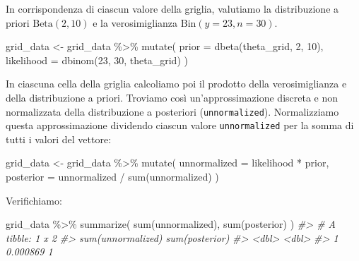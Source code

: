 \documentclass[
  11pt,
]{krantz}
\makeatletter
\newenvironment{Shaded}{\begin{snugshade}}{\end{snugshade}}
\newcommand{\AttributeTok}[1]{\textcolor[rgb]{0.61,0.61,0.61}{#1}}
\newcommand{\CommentTok}[1]{\textcolor[rgb]{0.37,0.37,0.37}{\textit{#1}}}
\newcommand{\DecValTok}[1]{\textcolor[rgb]{0.06,0.06,0.06}{#1}}
\newcommand{\FunctionTok}[1]{\textcolor[rgb]{0,0,0}{#1}}
\newcommand{\NormalTok}[1]{#1}
\newcommand{\OtherTok}[1]{\textcolor[rgb]{0.37,0.37,0.37}{#1}}
\newcommand{\SpecialCharTok}[1]{\textcolor[rgb]{0,0,0}{#1}}
\newenvironment{kframe}{%
\medskip{}
\setlength{\fboxsep}{.8em}
 \def\at@end@of@kframe{}%
 \ifinner\ifhmode%
  \def\at@end@of@kframe{\end{minipage}}%
  \begin{minipage}{\columnwidth}%
 \fi\fi%
 \def\FrameCommand##1{\hskip\@totalleftmargin \hskip-\fboxsep
 \colorbox{shadecolor}{##1}\hskip-\fboxsep
     \hskip-\linewidth \hskip-\@totalleftmargin \hskip\columnwidth}%
 \MakeFramed {\advance\hsize-\width
   \@totalleftmargin\z@ \linewidth\hsize
   \@setminipage}}%
 {\par\unskip\endMakeFramed%
 \at@end@of@kframe}
\renewenvironment{Shaded}{\begin{kframe}}{\end{kframe}}
\theoremstyle{definition}
\theoremstyle{definition}
\theoremstyle{definition}
\theoremstyle{definition}
\theoremstyle{remark}
\makeatother
\begin{document}
In corrispondenza di ciascun valore della griglia, valutiamo la distribuzione a priori \(\mbox{Beta}(2, 10)\) e la verosimiglianza \(\mbox{Bin}(y = 23, n = 30)\).

\begin{Shaded}
\begin{Highlighting}[]
\NormalTok{grid\_data }\OtherTok{\textless{}{-}}\NormalTok{ grid\_data }\SpecialCharTok{\%\textgreater{}\%}
  \FunctionTok{mutate}\NormalTok{(}
    \AttributeTok{prior =} \FunctionTok{dbeta}\NormalTok{(theta\_grid, }\DecValTok{2}\NormalTok{, }\DecValTok{10}\NormalTok{),}
    \AttributeTok{likelihood =} \FunctionTok{dbinom}\NormalTok{(}\DecValTok{23}\NormalTok{, }\DecValTok{30}\NormalTok{, theta\_grid)}
\NormalTok{  )}
\end{Highlighting}
\end{Shaded}

In ciascuna cella della griglia calcoliamo poi il prodotto della verosimiglianza e della distribuzione a priori. Troviamo così un'approssimazione discreta e non normalizzata della distribuzione a posteriori (\texttt{unnormalized}). Normalizziamo questa approssimazione dividendo ciascun valore \texttt{unnormalized} per la somma di tutti i valori del vettore:

\begin{Shaded}
\begin{Highlighting}[]
\NormalTok{grid\_data }\OtherTok{\textless{}{-}}\NormalTok{ grid\_data }\SpecialCharTok{\%\textgreater{}\%}
  \FunctionTok{mutate}\NormalTok{(}
    \AttributeTok{unnormalized =}\NormalTok{ likelihood }\SpecialCharTok{*}\NormalTok{ prior,}
    \AttributeTok{posterior =}\NormalTok{ unnormalized }\SpecialCharTok{/} \FunctionTok{sum}\NormalTok{(unnormalized)}
\NormalTok{  )}
\end{Highlighting}
\end{Shaded}

Verifichiamo:

\begin{Shaded}
\begin{Highlighting}[]
\NormalTok{grid\_data }\SpecialCharTok{\%\textgreater{}\%}
  \FunctionTok{summarize}\NormalTok{(}
    \FunctionTok{sum}\NormalTok{(unnormalized),}
    \FunctionTok{sum}\NormalTok{(posterior)}
\NormalTok{  )}
\CommentTok{\#\textgreater{} \# A tibble: 1 x 2}
\CommentTok{\#\textgreater{}   \textasciigrave{}sum(unnormalized)\textasciigrave{} \textasciigrave{}sum(posterior)\textasciigrave{}}
\CommentTok{\#\textgreater{}                 \textless{}dbl\textgreater{}            \textless{}dbl\textgreater{}}
\CommentTok{\#\textgreater{} 1            0.000869                1}
\end{Highlighting}
\end{Shaded}
\end{document}
